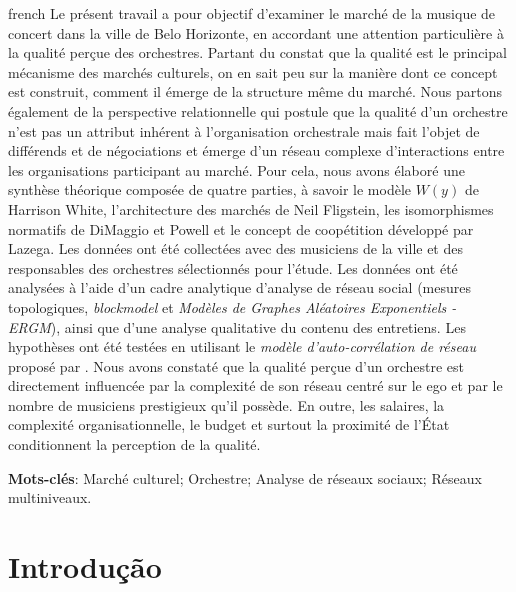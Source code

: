 \documentclass[a4paper, 12pt, openright, oneside, german, french, english, brazil]{abntex2}
\begin{document}
	\begin{resumo}[Résumé]
		\begin{otherlanguage*}{french}
                  Le présent travail a pour objectif d’examiner le marché de la musique de concert dans la ville de Belo Horizonte, en accordant une attention particulière à la qualité perçue des orchestres. Partant du constat que la qualité est le principal mécanisme des marchés culturels, on en sait peu sur la manière dont ce concept est construit, comment il émerge de la structure même du marché. Nous partons également de la perspective relationnelle qui postule que la qualité d’un orchestre n’est pas un attribut inhérent à l’organisation orchestrale mais fait l’objet de différends et de négociations et émerge d’un réseau complexe d’interactions entre les organisations participant au marché. Pour cela, nous avons élaboré une synthèse théorique composée de quatre parties, à savoir le modèle $W(y)$ de Harrison White, l'architecture des marchés de Neil Fligstein, les isomorphismes normatifs de DiMaggio et Powell et le concept de coopétition développé par Lazega. Les données ont été collectées avec des musiciens de la ville et des responsables des orchestres sélectionnés pour l'étude. Les données ont été analysées à l'aide d'un cadre analytique d'analyse de réseau social (mesures topologiques, \textit{blockmodel} et \textit{Modèles de Graphes Aléatoires Exponentiels - ERGM}), ainsi que d'une analyse qualitative du contenu des entretiens. Les hypothèses ont été testées en utilisant le \textit{modèle d'auto-corrélation de réseau} proposé par . Nous avons constaté que la qualité perçue d’un orchestre est directement influencée par la complexité de son réseau centré sur le ego et par le nombre de musiciens prestigieux qu’il possède. En outre, les salaires, la complexité organisationnelle, le budget et surtout la proximité de l'État conditionnent la perception de la qualité.
                  
			\vspace{\onelineskip}
			\noindent
			\textbf{Mots-clés}: Marché culturel; Orchestre; Analyse de réseaux sociaux; Réseaux multiniveaux.
		\end{otherlanguage*}
	\end{resumo}

	\listoffigures
	\listoftables
	\newpage
	\tableofcontents
	\textual

	\chapter*[Introdução]{Introdução}
\end{document}
